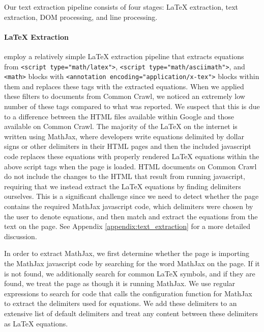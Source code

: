 


Our text extraction pipeline consists of four stages: \LaTeX{} extraction, text extraction, DOM processing, and line processing.

\paragraph{\LaTeX{} Extraction} \citet{lewkowycz2022solving} employ a relatively simple \LaTeX{} extraction pipeline that extracts equations from \texttt{<script type="math/latex">}, \texttt{<script type="math/asciimath">}, and \texttt{<math>} blocks with \texttt{<annotation encoding="application/x-tex">} blocks within them and replaces these tags with the extracted equations. When we applied these filters to documents from Common Crawl, we noticed an extremely low number of these tags compared to what was reported. We suspect that this is due to a difference between the HTML files available within Google \citep{lewkowycz2022solving} and those available on Common Crawl. The majority of the \LaTeX{} on the internet is written using MathJax, where developers write equations delimited by dollar signs or other delimiters in their HTML pages and then the included javascript code replaces these equations with properly rendered \LaTeX{} equations within the above script tags when the page is loaded. HTML documents on Common Crawl do not include the changes to the HTML that result from running javascript, requiring that we instead extract the \LaTeX{} equations by finding delimiters ourselves. This is a significant challenge since we need to detect whether the page contains the required MathJax javascript code, which delimiters were chosen by the user to denote equations, and then match and extract the equations from the text on the page. See Appendix \ref{appendix:text_extraction} for a more detailed discussion. 

In order to extract MathJax, we first determine whether the page is importing the MathJax javascript code by searching for the word MathJax on the page. If it is not found, we additionally search for common \LaTeX{} symbols, and if they are found, we treat the page as though it is running MathJax. We use regular expressions to search for code that calls the configuration function for MathJax to extract the delimiters used for equations. We add these delimiters to an extensive list of default delimiters and treat any content between these delimiters as \LaTeX{} equations.

